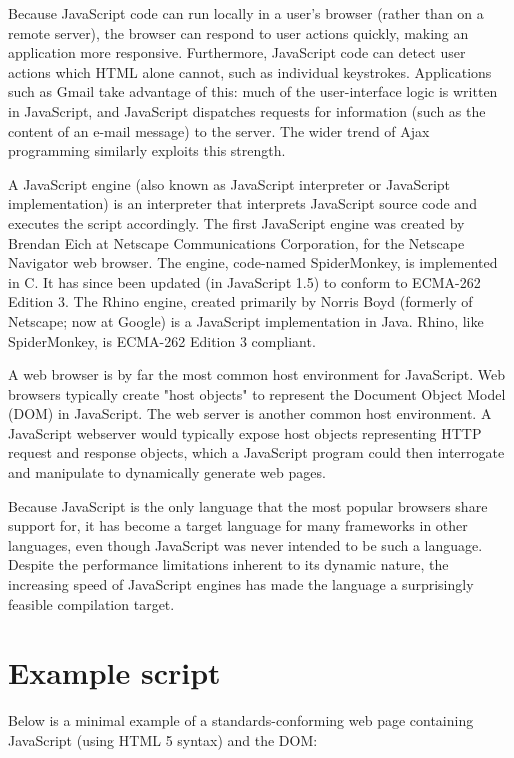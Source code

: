 Because JavaScript code can run locally in a user's browser (rather than on a remote server), the browser can respond to user actions quickly, making an application more responsive. Furthermore, JavaScript code can detect user actions which HTML alone cannot, such as individual keystrokes. Applications such as Gmail take advantage of this: much of the user-interface logic is written in JavaScript, and JavaScript dispatches requests for information (such as the content of an e-mail message) to the server. The wider trend of Ajax programming similarly exploits this strength.


A JavaScript engine (also known as JavaScript interpreter or JavaScript implementation) is an interpreter that interprets JavaScript source code and executes the script accordingly. The first JavaScript engine was created by Brendan Eich at Netscape Communications Corporation, for the Netscape Navigator web browser. The engine, code-named SpiderMonkey, is implemented in C. It has since been updated (in JavaScript 1.5) to conform to ECMA-262 Edition 3. The Rhino engine, created primarily by Norris Boyd (formerly of Netscape; now at Google) is a JavaScript implementation in Java. Rhino, like SpiderMonkey, is ECMA-262 Edition 3 compliant.


A web browser is by far the most common host environment for JavaScript. Web browsers typically create "host objects" to represent the Document Object Model (DOM) in JavaScript. The web server is another common host environment. A JavaScript webserver would typically expose host objects representing HTTP request and response objects, which a JavaScript program could then interrogate and manipulate to dynamically generate web pages.


Because JavaScript is the only language that the most popular browsers share support for, it has become a target language for many frameworks in other languages, even though JavaScript was never intended to be such a language. Despite the performance limitations inherent to its dynamic nature, the increasing speed of JavaScript engines has made the language a surprisingly feasible compilation target.


\section{Example script}

Below is a minimal example of a standards-conforming web page containing JavaScript (using HTML 5 syntax) and the DOM:



